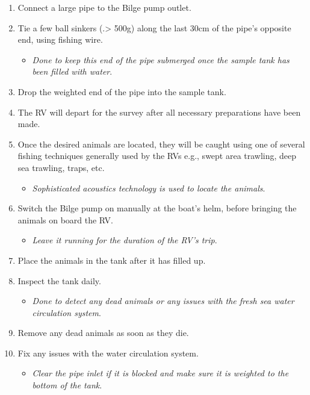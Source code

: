 \documentclass[
  12pt,
]{report}
\providecommand{\tightlist}{%
  \setlength{\itemsep}{0pt}\setlength{\parskip}{0pt}}\usepackage{longtable,booktabs,array}
\begin{document}
\begin{enumerate}
\def\labelenumi{\arabic{enumi}.}
\setcounter{enumi}{8}
\tightlist
\item
  Connect a large pipe to the Bilge pump outlet.
\item
  Tie a few ball sinkers (.\textgreater{} 500g) along the last 30cm of
  the pipe's opposite end, using fishing wire.

  \begin{itemize}
  \tightlist
  \item
    \emph{Done to keep this end of the pipe submerged once the sample
    tank has been filled with water}.
  \end{itemize}
\item
  Drop the weighted end of the pipe into the sample tank.
\item
  The RV will depart for the survey after all necessary preparations
  have been made.
\item
  Once the desired animals are located, they will be caught using one of
  several fishing techniques generally used by the RVs e.g., swept area
  trawling, deep sea trawling, traps, etc.

  \begin{itemize}
  \tightlist
  \item
    \emph{Sophisticated acoustics technology is used to locate the
    animals}.
  \end{itemize}
\item
  Switch the Bilge pump on manually at the boat's helm, before bringing
  the animals on board the RV.

  \begin{itemize}
  \tightlist
  \item
    \emph{Leave it running for the duration of the RV's trip}.
  \end{itemize}
\item
  Place the animals in the tank after it has filled up.
\item
  Inspect the tank daily.

  \begin{itemize}
  \tightlist
  \item
    \emph{Done to detect any dead animals or any issues with the fresh
    sea water circulation system}.
  \end{itemize}
\item
  Remove any dead animals as soon as they die.
\item
  Fix any issues with the water circulation system.

  \begin{itemize}
  \tightlist
  \item
    \emph{Clear the pipe inlet if it is blocked and make sure it is
    weighted to the bottom of the tank}.
  \end{itemize}
\end{enumerate}
\end{document}
